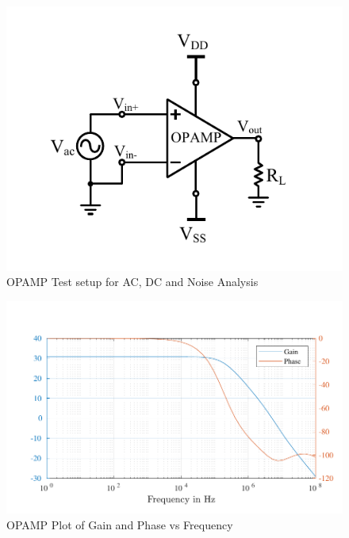 \begin{figure} [H]
\centering
\includegraphics[scale=1]{Figures/Test_Benches/OPAMP/OPAMP_ACDC.pdf}
\caption{OPAMP Test setup for AC, DC and Noise Analysis}
\end{figure}

\begin{figure} [H]
\centering
\includegraphics[scale=1]{Figures/Plots/OPAMP_Gain_PM.pdf}
\caption{OPAMP Plot of Gain and Phase vs Frequency}
\end{figure}


